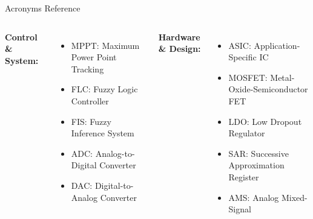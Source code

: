 \documentclass[aspectratio=169,usenames,dvipsnames]{beamer}
\begin{document}
\begin{frame}{Acronyms Reference}
    \small
    \begin{columns}
        \textbf{Control \& System:}
        \begin{itemize}
            \item MPPT: Maximum Power Point Tracking
            \item FLC: Fuzzy Logic Controller
            \item FIS: Fuzzy Inference System
            \item ADC: Analog-to-Digital Converter
            \item DAC: Digital-to-Analog Converter
        \end{itemize}
        
        \textbf{Hardware \& Design:}
        \begin{itemize}
            \item ASIC: Application-Specific IC
            \item MOSFET: Metal-Oxide-Semiconductor FET
            \item LDO: Low Dropout Regulator
            \item SAR: Successive Approximation Register
            \item AMS: Analog Mixed-Signal
        \end{itemize}
    \end{columns}
\end{frame}
\end{document}
